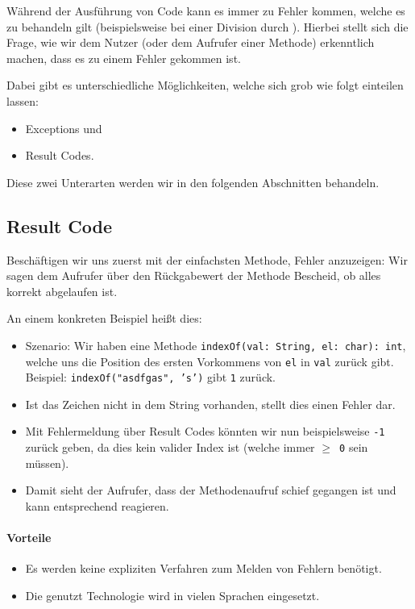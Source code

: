 
Während der Ausführung von Code kann es immer zu Fehler kommen, welche es zu behandeln gilt (beispielsweise bei einer Division durch ). Hierbei stellt sich die Frage, wie wir dem Nutzer (oder dem Aufrufer einer Methode) erkenntlich machen, dass es zu einem Fehler gekommen ist.

Dabei gibt es unterschiedliche Möglichkeiten, welche sich grob wie folgt einteilen lassen:
\begin{itemize}
	\item Exceptions und
	\item Result Codes.
\end{itemize}

Diese zwei Unterarten werden wir in den folgenden Abschnitten behandeln.

\subsection{Result Code}

	Beschäftigen wir uns zuerst mit der einfachsten Methode, Fehler anzuzeigen: Wir sagen dem Aufrufer über den Rückgabewert der Methode Bescheid, ob alles korrekt abgelaufen ist.
	
	An einem konkreten Beispiel heißt dies:
	\begin{itemize}
		\item Szenario: Wir haben eine Methode \texttt{indexOf(val: String, el: char): int}, welche uns die Position des ersten Vorkommens von \texttt{el} in \texttt{val} zurück gibt. \\ Beispiel: \texttt{indexOf("asdfgas", 's')} gibt \texttt{1} zurück.
		\item Ist das Zeichen nicht in dem String vorhanden, stellt dies einen Fehler dar.
		\item Mit Fehlermeldung über Result Codes könnten wir nun beispielsweise \texttt{-1} zurück geben, da dies kein valider Index ist (welche immer \texttt{\(\geq\) 0} sein müssen).
		\item Damit sieht der Aufrufer, dass der Methodenaufruf schief gegangen ist und kann entsprechend reagieren.
	\end{itemize}
	
	\paragraph{Vorteile}
		\begin{itemize}
			\item Es werden keine expliziten Verfahren zum Melden von Fehlern benötigt.
			\item Die genutzt Technologie wird in vielen Sprachen eingesetzt.
		\end{itemize}
	
